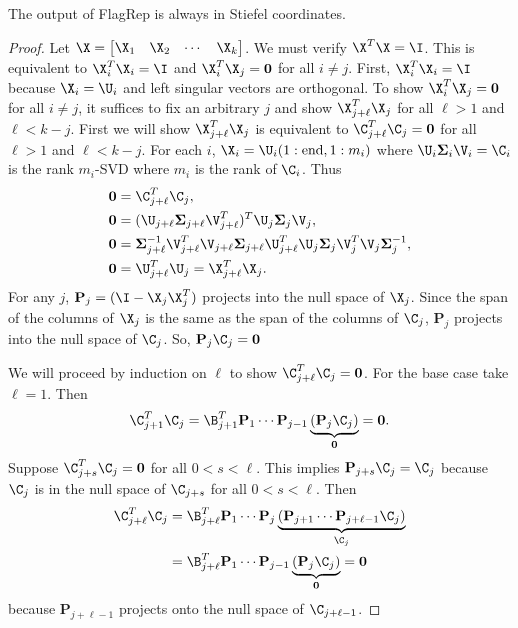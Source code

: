 \begin{prop}\label{prop:stiefelcoords}
    The output of FlagRep is always in Stiefel coordinates.
\end{prop}
\begin{proof}
    Let $\X = \begin{bmatrix} \X_1 &\X_2 & \cdots & \X_k \end{bmatrix}$. We must verify $\X^T \X = \I$. This is equivalent to $\X_i^T\X_i = \I$ and $\X_i^T\X_j = \mathbf{0}$ for all $i\neq j$. First, $\X_i^T\X_i = \I$ because $\X_i = \U_i$ and left singular vectors are orthogonal.    
    To show $\X_i^T\X_j = \mathbf{0}$ for all $i\neq j$, it suffices to fix an arbitrary $j$ and show $\X_{j+\ell}^T\X_j$ for all $\ell > 1$ and $\ell < k-j$. 
    First we will show $\X_{j+\ell}^T\X_j$ is equivalent to $\C_{j+\ell}^T\C_{j}= \mathbf{0}$ for all $\ell > 1$ and $\ell < k-j$.  For each $i$, $\X_i = \U_i(1:\mathrm{end},1:m_i)$ where $\U_i \mathbf{\Sigma}_i \V_i = \C_i$ is the rank $m_i$-SVD where $m_i$ is the rank of $\C_i$. Thus
    \begin{align*}
        \mathbf{0} &= \C_{j+\ell}^T\C_{j}, \\
        \mathbf{0} &= (\U_{j+\ell} \mathbf{\Sigma}_{j+\ell} \V_{j+\ell}^T)^T\U_{j} \mathbf{\Sigma}_{j} \V_{j}, \\
        \mathbf{0} &= \mathbf{\Sigma}_{j+\ell}^{-1} \V_{j+\ell}^T \V_{j+\ell} \mathbf{\Sigma}_{j+\ell} \U_{j+\ell}^T \U_{j} \mathbf{\Sigma}_j \V_j^T \V_j \mathbf{\Sigma}_j^{-1},\\
        \mathbf{0} &= \U_{j+\ell}^T \U_j = \X_{j+\ell}^T \X_j. 
    \end{align*}
For any $j$, $\mathbf{P}_j = (\I - \X_j \X_j^T)$ projects into the null space of $\X_j$. Since the span of the columns of $\X_j$ is the same as the span of the columns of $\C_j$, $\mathbf{P}_j$ projects into the null space of $\C_j$. So, $\mathbf{P}_j \C_j= \mathbf{0}$
    
    We will proceed by induction on $\ell$ to show $\C_{j + \ell}^T\C_j = \mathbf{0}$. For the base case take $\ell = 1$. Then
    \begin{equation}
        \C_{j + 1}^T\C_j = \B_{j + 1}^T\mathbf{P}_1 \cdots \mathbf{P}_{j-1}\underbrace{(\mathbf{P}_j\C_j)}_{\mathbf{0}} = \mathbf{0}.
    \end{equation}
    Suppose $\C_{j + s}^T\C_j = \mathbf{0}$ for all $0 < s < \ell$. This implies $\mathbf{P}_{j + s}\C_j = \C_j$ because $\C_j$ is in the null space of $\C_{j + s}$ for all $0 < s < \ell$. Then
    \begin{align}
        \C_{j + \ell}^T\C_j &= \B_{j + \ell}^T\mathbf{P}_1 \cdots \mathbf{P}_j \underbrace{(\mathbf{P}_{j+1} \cdots \mathbf{P}_{j+\ell -1}\C_j)}_{\C_j}\\
        &= \B_{j + \ell}^T\mathbf{P}_1 \cdots \mathbf{P}_{j-1}\underbrace{(\mathbf{P}_j \C_j)}_{\mathbf{0}} = \mathbf{0}
    \end{align}
because $\mathbf{P}_{j+\ell -1}$ projects onto the null space of $\C_{j+\ell - 1}$.
\end{proof}

